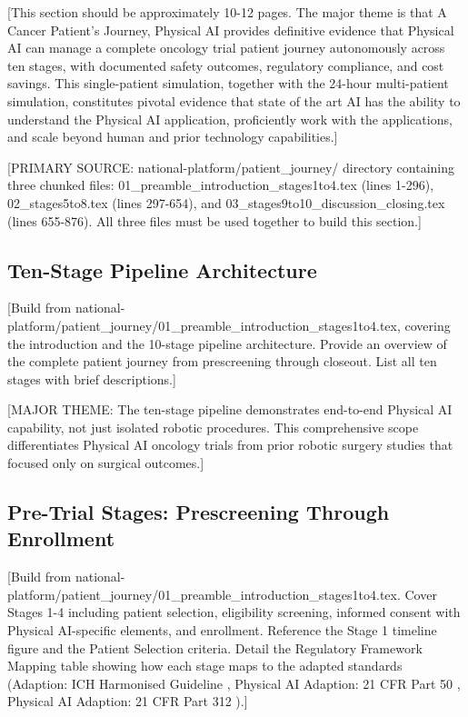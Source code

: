 
[This section should be approximately 10-12 pages. The major theme is that
A Cancer Patient's Journey, Physical AI \cite{patient-journey-paper} provides
definitive evidence that Physical AI can manage a complete oncology trial
patient journey autonomously across ten stages, with documented safety
outcomes, regulatory compliance, and cost savings. This single-patient
simulation, together with the 24-hour multi-patient simulation, constitutes
pivotal evidence that state of the art AI has the ability to understand the
Physical AI application, proficiently work with the applications, and scale
beyond human and prior technology capabilities.]

[PRIMARY SOURCE: national-platform/patient\_journey/ directory containing three
chunked files: 01\_preamble\_introduction\_stages1to4.tex (lines 1-296),
02\_stages5to8.tex (lines 297-654), and
03\_stages9to10\_discussion\_closing.tex (lines 655-876). All three files must
be used together to build this section.]

\subsection{Ten-Stage Pipeline Architecture}
\label{subsec:journey-pipeline}

[Build from national-platform/patient\_journey/01\_preamble\_introduction\_stages1to4.tex,
covering the introduction and the 10-stage pipeline architecture. Provide an
overview of the complete patient journey from prescreening through closeout.
List all ten stages with brief descriptions.]

[MAJOR THEME: The ten-stage pipeline demonstrates end-to-end Physical AI
capability, not just isolated robotic procedures. This comprehensive scope
differentiates Physical AI oncology trials from prior robotic surgery studies
that focused only on surgical outcomes.]

\subsection{Pre-Trial Stages: Prescreening Through Enrollment}
\label{subsec:journey-pretrial}

[Build from national-platform/patient\_journey/01\_preamble\_introduction\_stages1to4.tex.
Cover Stages 1-4 including patient selection, eligibility screening, informed
consent with Physical AI-specific elements, and enrollment. Reference the
Stage 1 timeline figure and the Patient Selection criteria. Detail the
Regulatory Framework Mapping table showing how each stage maps to the adapted
standards (Adaption: ICH Harmonised Guideline \cite{ich-adapt}, Physical AI
Adaption: 21 CFR Part 50 \cite{cfr50-adapt}, Physical AI Adaption: 21 CFR
Part 312 \cite{cfr312-adapt}).]

